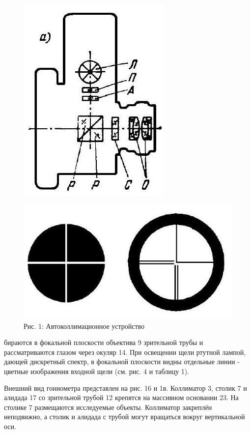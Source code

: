 \documentclass[a4paper,12pt]{article} %
\begin{document}
\begin{figure}[H]
    \centering
    \includegraphics[scale=0.4]{1.jpg}

    \includegraphics[scale=0.4]{2.jpg}\\
    {Рис. 1: Автоколлимационное устройство}
    \label{fig:my_label}
\end{figure}


бираются в фокальной плоскости объектива 9 зрительной трубы и рассматриваются глазом через окуляр 14. При освещении щели ртутной лампой, дающей дискретный спектр, в фокальной плоскости видны отдельные линии - цветные изображения входной щели (см. рис. 4 и таблицу 1).

Внешний вид гониометра представлен на рис. 16 и 1в. Коллиматор 3, столик 7 и алидада 17 со зрительной трубой 12 крепятся на массивном основании 23. На столике 7 размещаются исследуемые объекты. Коллиматор закреплён неподвижно, а столик и алидада с трубой могут вращаться вокруг вертикальной оси.
\end{document}

